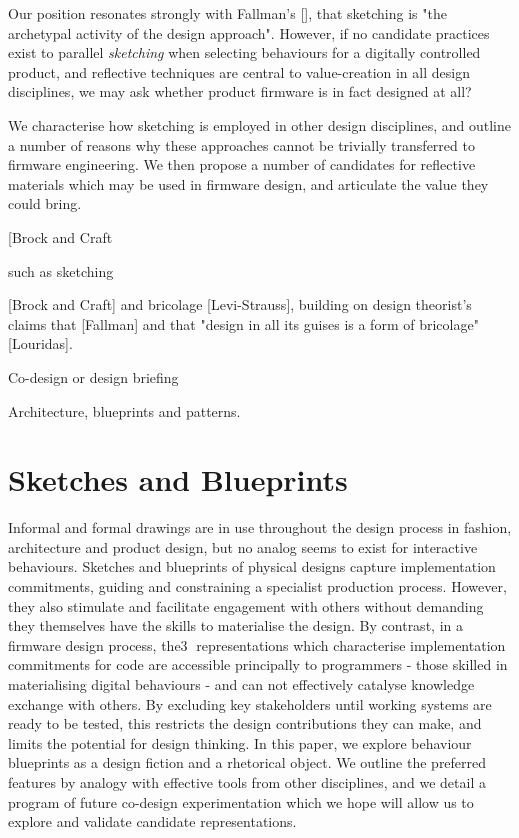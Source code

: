 \documentclass{chi-ext}
\begin{document}
Our position resonates strongly with Fallman's [], that sketching is "the archetypal activity of the design approach". However, if no candidate practices exist to parallel \emph{sketching} when selecting behaviours for a digitally controlled product, and reflective techniques are central to value-creation in all design disciplines, we may ask whether product firmware is in fact designed at all?

We characterise how sketching is employed in other design disciplines, and outline a number of reasons why these approaches cannot be trivially transferred to firmware engineering. We then propose a number of candidates for reflective materials which may be used in firmware design, and articulate the value they could bring.  


[Brock and Craft





 such as sketching 

[Brock and Craft] and bricolage [Levi-Strauss], building on design theorist's claims that  [Fallman] and that "design in all its guises is a form of bricolage"[Louridas].



Co-design or design briefing

Architecture, blueprints and patterns.

\section{Sketches and Blueprints}
Informal and formal drawings are in use throughout the design process in fashion, architecture and product design, but no analog seems to exist for interactive behaviours. Sketches and blueprints of physical designs capture implementation commitments, guiding and constraining a specialist production process. However, they also stimulate and facilitate engagement with others without demanding they themselves have the skills to materialise the design. By contrast, in a firmware design process, the3 representations which characterise implementation commitments for code are accessible principally to programmers - those skilled in materialising digital behaviours - and can not effectively catalyse knowledge exchange with others. By excluding key stakeholders until working systems are ready to be tested, this restricts the design contributions they can make, and limits the potential for design thinking. In this paper, we explore behaviour blueprints as a design fiction and a rhetorical object. We outline the preferred features by analogy with effective tools from other disciplines, and we detail a program of future co-design experimentation which we hope will allow us to explore and validate candidate representations.
\end{document}
